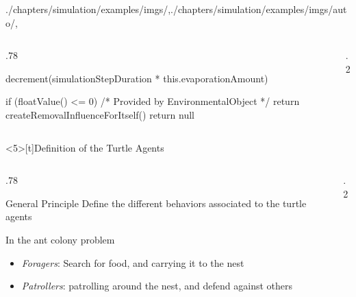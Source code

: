 \begin{graphicspathcontext}{{./chapters/simulation/examples/imgs/},{./chapters/simulation/examples/imgs/auto/},\old}
\begin{frame}
\begin{columns}
\begin{column}[t]{.78\linewidth}
\begin{sarllisting}[basicstyle=\scriptsize]
{{   decrement(simulationStepDuration
             * this.evaporationAmount)

   if (floatValue() <= 0) {
     /* Provided by EnvironmentalObject */
     return createRemovalInfluenceForItself()
   }
   return null
  }
}
			\end{sarllisting}
		\end{column}
		\begin{column}[t]{.2\linewidth}
		\end{column}
	\end{columns}
\end{frame}

\begin{frame}<5>[t]{Definition of the Turtle Agents}
	\vspace{-.5cm}
	\smaller
	\begin{columns}
		\begin{column}[t]{.78\linewidth}
			\begin{alertblock}{General Principle}
			Define the different behaviors associated to the turtle agents
			\end{alertblock}
			\begin{block}{In the ant colony problem}
				\begin{itemize}
				\item \emph{Foragers}: Search for food, and carrying it to the nest
				\item \emph{Patrollers}: patrolling around the nest, and defend against others
				\end{itemize}
			\end{block}
		\end{column}
		\begin{column}[t]{.2\linewidth}
		\end{column}
	\end{columns}
\end{frame}


\end{graphicspathcontext}

